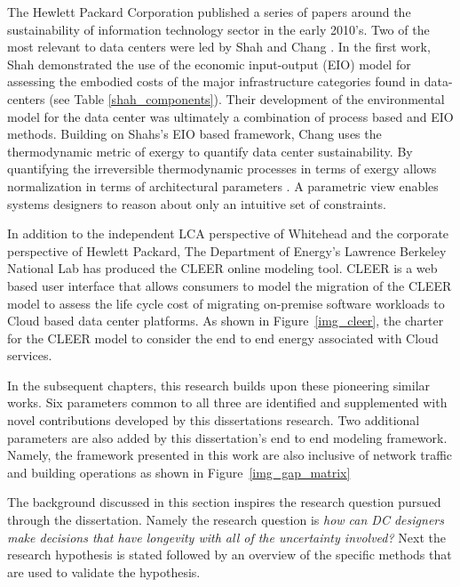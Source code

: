     The Hewlett Packard Corporation published a series of papers around the sustainability of information technology sector in the early 2010's. Two of the most relevant to data centers were led by Shah and Chang \cite{shah11, shah12}. In the first work, Shah demonstrated the use of the economic input-output (EIO) model for assessing the embodied costs of the major infrastructure categories found in data-centers (see Table \ref{shah_components}). Their development of the environmental model for the data center was ultimately a combination of process based and EIO methods. Building on Shahs's EIO based framework, Chang uses the thermodynamic metric of exergy to quantify data center sustainability. By quantifying the irreversible thermodynamic processes in terms of exergy allows normalization in terms of architectural parameters \cite{shah12}. A parametric view enables systems designers to reason about only an intuitive set of constraints.
    
    
    
    In addition to the independent LCA perspective of Whitehead and the corporate perspective of Hewlett Packard, The Department of Energy's Lawrence Berkeley National Lab  has produced the CLEER online modeling tool\cite{CLEER13}. CLEER is a web based user interface that allows consumers to model the migration of the CLEER model to assess the life cycle cost of migrating on-premise software workloads to Cloud based data center platforms. As shown in Figure~\ref{img_cleer}, the charter for the CLEER model to consider the end to end energy associated with Cloud services.
    
    
    
    In the subsequent chapters, this research builds upon these pioneering similar works. Six parameters common to all three are identified and supplemented with novel contributions developed by this dissertations research. Two additional parameters are also added by this dissertation's end to end modeling framework. Namely, the framework presented in this work are also inclusive of network traffic and building operations as shown in Figure~\ref{img_gap_matrix}
    
    
    
    The background discussed in this section inspires the research question pursued through the dissertation. Namely the research question is \emph{how can DC designers make decisions that have longevity with all of the uncertainty involved?} Next the research hypothesis is stated followed by an overview of the specific methods that are used to validate the hypothesis.
    
